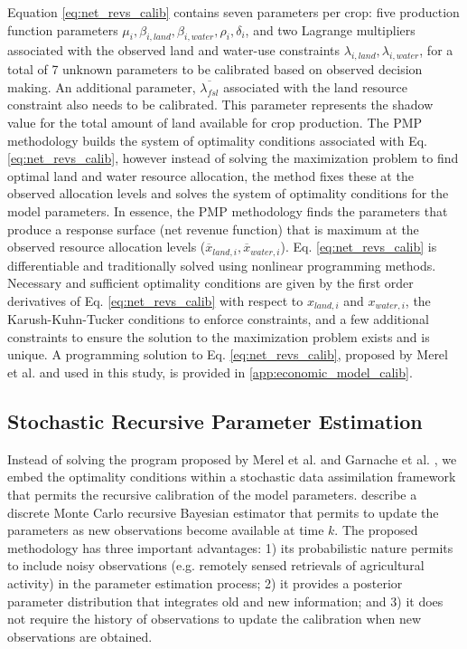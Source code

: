 Equation \eqref{eq:net_revs_calib} contains seven parameters per crop: five production function parameters  $\mu_i, \beta_{i,land}, \beta_{i,water}, \rho_i, \delta_i$, and two Lagrange multipliers associated with the observed land and water-use constraints $\lambda_{i, land}, \lambda_{i,water}$, for a total of 7 unknown parameters to be calibrated based on observed decision making. An additional parameter, $\overline{\lambda_{fsl}}$ associated with the land resource constraint also needs to be calibrated. This parameter represents the shadow value for the total amount of land available for crop production.  %
The PMP methodology builds the system of optimality conditions associated with Eq. \eqref{eq:net_revs_calib}, however instead of solving the maximization problem to find optimal land and water resource allocation, the method fixes these at the observed allocation levels and solves the system of optimality conditions for the model parameters. In essence, the PMP methodology finds the parameters that produce a response surface (net revenue function) that is maximum at the observed resource allocation levels ($\overline{x}_{land,i}, \overline{x}_{water,i}$). Eq. \ref{eq:net_revs_calib} is differentiable and traditionally solved using nonlinear programming methods. Necessary and sufficient optimality conditions are given by the first order derivatives of Eq. \ref{eq:net_revs_calib} with respect to $x_{land,i}$ and $x_{water,i}$, the Karush-Kuhn-Tucker conditions to enforce constraints, and a few additional constraints to ensure the solution to the maximization problem exists and is unique.  A programming solution to Eq. \ref{eq:net_revs_calib}, proposed by Merel et al. \citet{Merel2011b} and used in this study, is provided in \ref{app:economic_model_calib}.  



\subsection{Stochastic Recursive Parameter Estimation}

Instead of solving the program proposed by Merel et al. \citet{Merel2011b} and Garnache et al. \citep{Garnache2017}, we embed the optimality conditions within a stochastic data assimilation framework that permits the recursive calibration of the model parameters. \citet{Maneta2014} describe a discrete Monte Carlo recursive Bayesian estimator that permits to update the parameters as new observations become available at time $k$. The proposed methodology has three important advantages: 1) its probabilistic nature permits to include noisy observations (e.g. remotely sensed retrievals of agricultural activity) in the parameter estimation process; 2) it provides a posterior parameter distribution that integrates old and new information; and 3) it does not require the history of observations to update the calibration when new observations are obtained. 

